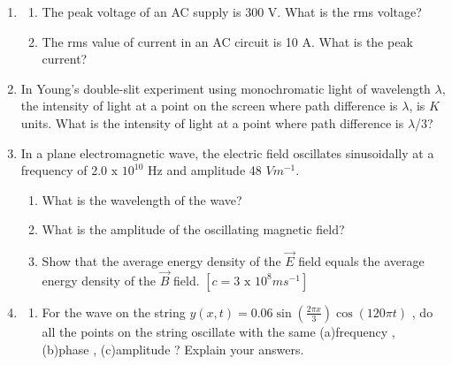 \begin{enumerate}[label=\thesection.\arabic*,ref=\thesection.\theenumi]
\begin{enumerate} [label=(\alph*)]
    \item $4 m$
    \item $0.5 m$
    \item $\lambda/2$
    \item $3\lambda/4$
\end{enumerate}
\solution

\pagebreak
\item 
\begin{enumerate}
\item The peak voltage of an AC supply is 300 V. What is the rms voltage?
\item The rms value of current in an AC circuit is 10 A. What is the peak current?
\end{enumerate}
\solution


\pagebreak
\item In Young’s double-slit experiment using monochromatic light of wavelength $\lambda$, the intensity of light at a point on the screen where path difference is $\lambda$, is $K$ units. What is the intensity of light at a
point where path difference is $\lambda$/3?\\

\solution


\pagebreak

\item In a plane electromagnetic wave, the electric field oscillates sinusoidally at a frequency of $2.0 \text{ x } 10^{10}$ Hz and amplitude 48 $Vm^{-1}$.
\begin{enumerate}[label=(\alph*)]
    \item What is the wavelength of the wave?
    \item What is the amplitude of the oscillating magnetic field?
    \item Show that the average energy density of the $\vec{E}$ field equals the
average energy density of the $\vec{B}$ field. $[c = 3 \text{ x } 10^{8}ms^{-1} ]$
\end{enumerate}

\item \begin{enumerate}
\item For the wave on the string $y(x, t) = 0.06 \sin(\frac{2\pi x}{3}) \cos(120\pi t)$ , do all the points on the string     oscillate with the same (a)frequency , (b)phase , (c)amplitude ? Explain your answers. \\


\end{enumerate}
\end{enumerate}
